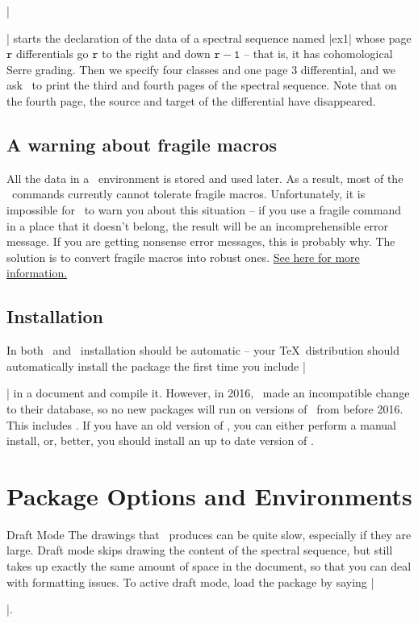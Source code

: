 |\begin{sseqdata}[|| name = ex1, cohomological Serre grading]| starts the declaration of the data of a spectral sequence named |ex1| whose page $\mathtt{r}$ differentials go $\mathtt{r}$ to the right and down $\mathtt{r-1}$ -- that is, it has cohomological Serre grading. Then we specify four classes and one page 3 differential, and we ask \sseqpages\  to print the third and fourth pages of the spectral sequence. Note that on the fourth page, the source and target of the differential have disappeared.

\subsection{A warning about fragile macros}%
All the data in a \sseqpages\  environment is stored and used later. As a result, most of the \sseqpages\  commands currently cannot tolerate fragile macros. Unfortunately, it is impossible for \sseqpages\  to warn you about this situation -- if you use a fragile command in a place that it doesn't belong, the result will be an incomprehensible error message. If you are getting nonsense error messages, this is probably why. The solution is to convert fragile macros into robust ones. \href{http://www.tex.ac.uk/FAQ-protect.html}{See here for more information.}

\subsection{Installation}
In both \miktex\ and \texlive\ installation should be automatic -- your \TeX\ distribution should automatically install the package the first time you include |\usepackage{spectralsequences}| in a document and compile it. However, in 2016, \texlive\ made an incompatible change to their database, so no new packages will run on versions of \texlive\ from before 2016. This includes \sseqpages. If you have an old version of \texlive, you can either perform a manual install,
or, better, you should install an up to date version of \texlive.


\section{Package Options and Environments}
\begin{manualentry}{Draft Mode}
The drawings that \sseqpages\ produces can be quite slow, especially if they are large. Draft mode skips drawing the content of the spectral sequence, but still takes up exactly the same amount of space in the document, so that you can deal with formatting issues. To active draft mode, load the package by saying |\usepackage[draft]{spectralsequences}|.
\end{manualentry}


\end{sseqdata}
